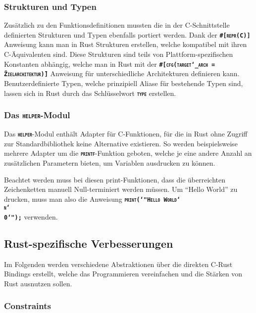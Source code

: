 \subsubsection{Strukturen und Typen}

Zusätzlich zu den Funktionsdefinitionen mussten die in der C-Schnittstelle definierten
Strukturen und Typen ebenfalls portiert werden.
Dank der \texttt{\textsc{\textbf{\#[repr(C)]}}} Anweisung kann man in Rust Strukturen erstellen,
welche kompatibel mit ihren C-Äquivalenten sind.
Diese Strukturen sind teils von Plattform-spezifischen Konstanten abhängig, welche man in Rust mit der
\texttt{\textsc{\textbf{\#[cfg(target\char`_arch = \"Zielarchitektur\")]}}} Anweisung
für unterschiedliche Architekturen definieren kann.
Benutzerdefinierte Typen, welche prinzipiell Aliase für bestehende Typen sind, lassen sich in Rust durch das
Schlüsselwort \texttt{\textsc{\textbf{type}}} erstellen.

\subsubsection{Das \texttt{\textsc{\textbf{helper}}}-Modul}

Das \texttt{\textsc{\textbf{helper}}}-Modul enthält Adapter für C-Funktionen,
für die in Rust ohne Zugriff zur Standardbibliothek keine Alternative existieren.
So werden beispielsweise mehrere Adapter um die \texttt{\textsc{\textbf{printf}}}-Funktion geboten,
welche je eine andere Anzahl an zusätzlichen Parametern bieten, um Variablen ausdrucken zu können.

Beachtet werden muss bei diesen print-Funktionen, dass die überreichten Zeichenketten manuell
Null-terminiert werden müssen. Um "`Hello World"' zu drucken, muss man also die Anweisung
\texttt{\textsc{\textbf{print(\char`"Hello World\char`\\n\char`\\0\char`");}}} verwenden.

\subsection{Rust-spezifische Verbesserungen}

Im Folgenden werden verschiedene Abstraktionen über die direkten C-Rust Bindings erstellt, welche das Programmieren
vereinfachen und die Stärken von Rust ausnutzen sollen.

\subsubsection{Constraints}

